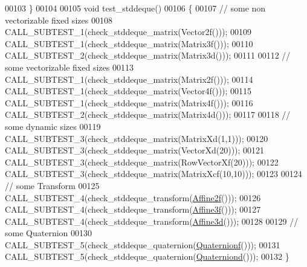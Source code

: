 \begin{DoxyCode}
00103 \}
00104 
00105 \textcolor{keywordtype}{void} test\_stddeque()
00106 \{
00107   \textcolor{comment}{// some non vectorizable fixed sizes}
00108   CALL\_SUBTEST\_1(check\_stddeque\_matrix(Vector2f()));
00109   CALL\_SUBTEST\_1(check\_stddeque\_matrix(Matrix3f()));
00110   CALL\_SUBTEST\_2(check\_stddeque\_matrix(Matrix3d()));
00111 
00112   \textcolor{comment}{// some vectorizable fixed sizes}
00113   CALL\_SUBTEST\_1(check\_stddeque\_matrix(Matrix2f()));
00114   CALL\_SUBTEST\_1(check\_stddeque\_matrix(Vector4f()));
00115   CALL\_SUBTEST\_1(check\_stddeque\_matrix(Matrix4f()));
00116   CALL\_SUBTEST\_2(check\_stddeque\_matrix(Matrix4d()));
00117 
00118   \textcolor{comment}{// some dynamic sizes}
00119   CALL\_SUBTEST\_3(check\_stddeque\_matrix(MatrixXd(1,1)));
00120   CALL\_SUBTEST\_3(check\_stddeque\_matrix(VectorXd(20)));
00121   CALL\_SUBTEST\_3(check\_stddeque\_matrix(RowVectorXf(20)));
00122   CALL\_SUBTEST\_3(check\_stddeque\_matrix(MatrixXcf(10,10)));
00123 
00124   \textcolor{comment}{// some Transform}
00125   CALL\_SUBTEST\_4(check\_stddeque\_transform(\hyperlink{group___geometry___module_ga2c1ea05a21899654ee3a2e3f91fa30e0}{Affine2f}()));
00126   CALL\_SUBTEST\_4(check\_stddeque\_transform(\hyperlink{group___geometry___module_ga17e901de8ff882aea7845c5457db6a4f}{Affine3f}()));
00127   CALL\_SUBTEST\_4(check\_stddeque\_transform(\hyperlink{group___geometry___module_gaaffa69d3143826efeb84e5d6c56a4c78}{Affine3d}()));
00128 
00129   \textcolor{comment}{// some Quaternion}
00130   CALL\_SUBTEST\_5(check\_stddeque\_quaternion(\hyperlink{group___geometry___module_ga785b13a5a87f9bf55d4eba51ead2dcf0}{Quaternionf}()));
00131   CALL\_SUBTEST\_5(check\_stddeque\_quaternion(\hyperlink{group___geometry___module_ga6e77eb8b6aae0e04be2db88107dbc642}{Quaterniond}()));
00132 \}
\end{DoxyCode}
